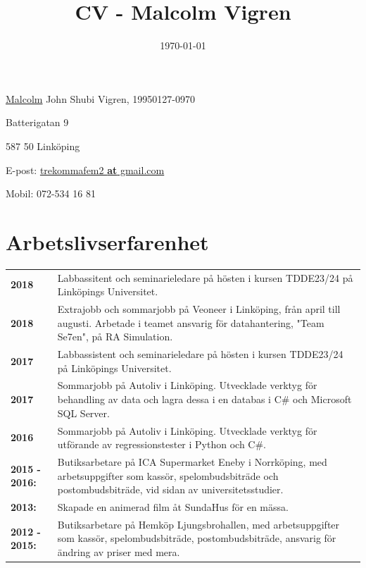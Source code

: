 \documentclass[a4paper,notitlepage]{article}
\title{
\huge{CV - Malcolm Vigren}\vspace{-3ex}}
\date{\today}
\begin{document}
	\maketitle
\underline{Malcolm} John Shubi Vigren, 19950127-0970

Batterigatan 9

587 50 Linköping

E-post: \underline{trekommafem2 \textbf{at} gmail.com}

Mobil: 072-534 16 81

\section*{Arbetslivserfarenhet}
\noindent\begin{tabular}{@{}l p{13cm}}

\textbf{2018} & Labbassitent och seminarieledare på hösten i kursen TDDE23/24 på Linköpings
    Universitet. \\

\textbf{2018} & Extrajobb och sommarjobb på Veoneer i Linköping, från april till augusti.
    Arbetade i teamet ansvarig för datahantering, "Team Se7en", på RA Simulation. \\

\textbf{2017} & Labbassistent och seminarieledare på hösten i kursen TDDE23/24 på Linköpings
    Universitet. \\

\textbf{2017} & Sommarjobb på Autoliv i Linköping. Utvecklade verktyg 
    för behandling av data och lagra dessa i en databas i C\# och Microsoft SQL Server. \\

\textbf{2016} & Sommarjobb på Autoliv i Linköping. Utvecklade verktyg för
    utförande av regressionstester i Python och C\#.\\

\textbf{2015 - 2016:} & Butiksarbetare på ICA Supermarket Eneby i Norrköping, med
arbetsuppgifter som kassör, spelombudsbiträde och postombudsbiträde, vid sidan
av universitetsstudier. \\

\textbf{2013:} & Skapade en animerad film åt SundaHus för en mässa.
\\

\textbf{2012 - 2015:} & Butiksarbetare på Hemköp Ljungsbrohallen,
med arbetsuppgifter
som kassör,
spelombudsbiträde, postombudsbiträde, ansvarig för ändring av priser med mera.
\\


\end{tabular}
\end{document}
